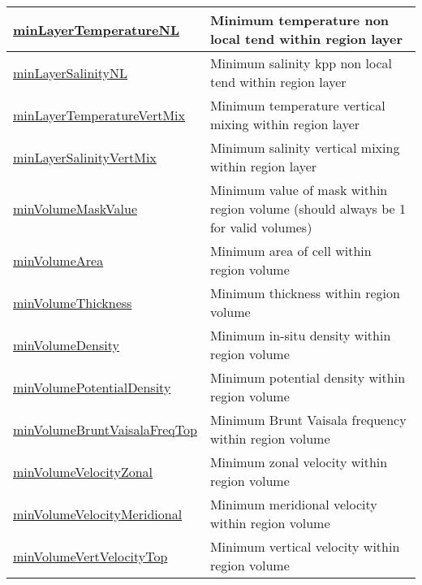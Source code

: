 {\begin{center}
\begin{longtable}{| p{2.0in} | p{4.0in} |}
    \hline
    \hyperref[subsec:var_sec_layerVolumeWeightedAverageAM_minLayerTemperatureNL]{minLayerTemperatureNL} & Minimum temperature non local tend within region layer \\
    \hline
    \hyperref[subsec:var_sec_layerVolumeWeightedAverageAM_minLayerSalinityNL]{minLayerSalinityNL} & Minimum salinity kpp non local tend within region layer \\
    \hline
    \hyperref[subsec:var_sec_layerVolumeWeightedAverageAM_minLayerTemperatureVertMix]{minLayerTemperatureVertMix} & Minimum temperature vertical mixing within region layer \\
    \hline
    \hyperref[subsec:var_sec_layerVolumeWeightedAverageAM_minLayerSalinityVertMix]{minLayerSalinityVertMix} & Minimum salinity vertical mixing within region layer \\
    \hline
    \hyperref[subsec:var_sec_layerVolumeWeightedAverageAM_minVolumeMaskValue]{minVolumeMaskValue} & Minimum value of mask within region volume (should always be 1 for valid volumes) \\
    \hline
    \hyperref[subsec:var_sec_layerVolumeWeightedAverageAM_minVolumeArea]{minVolumeArea} & Minimum area of cell within region volume \\
    \hline
    \hyperref[subsec:var_sec_layerVolumeWeightedAverageAM_minVolumeThickness]{minVolumeThickness} & Minimum thickness within region volume \\
    \hline
    \hyperref[subsec:var_sec_layerVolumeWeightedAverageAM_minVolumeDensity]{minVolumeDensity} & Minimum in-situ density within region volume \\
    \hline
    \hyperref[subsec:var_sec_layerVolumeWeightedAverageAM_minVolumePotentialDensity]{minVolumePotentialDensity} & Minimum potential density within region volume \\
    \hline
    \hyperref[subsec:var_sec_layerVolumeWeightedAverageAM_minVolumeBruntVaisalaFreqTop]{minVolumeBruntVaisalaFreqTop} & Minimum Brunt Vaisala frequency within region volume \\
    \hline
    \hyperref[subsec:var_sec_layerVolumeWeightedAverageAM_minVolumeVelocityZonal]{minVolumeVelocityZonal} & Minimum zonal velocity within region volume \\
    \hline
    \hyperref[subsec:var_sec_layerVolumeWeightedAverageAM_minVolumeVelocityMeridional]{minVolumeVelocityMeridional} & Minimum meridional velocity within region volume \\
    \hline
    \hyperref[subsec:var_sec_layerVolumeWeightedAverageAM_minVolumeVertVelocityTop]{minVolumeVertVelocityTop} & Minimum vertical velocity within region volume \\

\end{longtable}
\end{center}}
